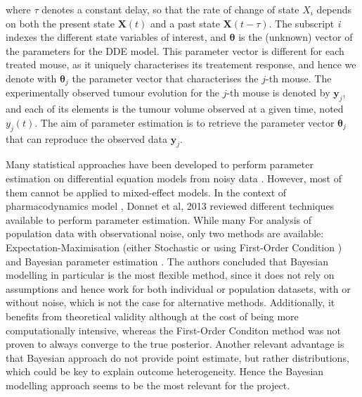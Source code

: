 \documentclass[11pt]{article}
\begin{document}
where $\tau$ denotes a constant delay, so that the rate of change of state $X_i$ depends on both the present state $\boldsymbol{X}(t)$ and a past state $\boldsymbol{X}(t-\tau)$. The subscript \textit{i} indexes the different state variables of interest, and $\boldsymbol{\theta}$ is the (unknown) vector of the parameters for the DDE model. This parameter vector is different for each treated mouse, as it uniquely characterises its treatement response, and hence we denote with $\boldsymbol{\theta}_j$ the parameter vector that characterises the $j$-th mouse. The experimentally observed tumour evolution for the $j$-th mouse is denoted by $\boldsymbol{y}_j$, and each of its elements is the tumour volume observed at a given time, noted $y_{j}(t)$. The aim of parameter estimation is to retrieve the parameter vector $\boldsymbol{\theta}_j$ that can reproduce the observed data $\boldsymbol{y}_j$. 



Many statistical approaches have been developed to perform parameter estimation on differential equation models from noisy data \cite{liu_wang}. However, most of them cannot be applied to mixed-effect models. In the context of pharmacodynamics model , Donnet et al, 2013 \cite{revParamEst} reviewed different techniques available to perform parameter estimation. While many For analysis of population data with observational noise, only two methods are available: Expectation-Maximisation (either Stochastic \cite{SAEM} or using First-Order Condition \cite{foce}) and Bayesian parameter estimation \cite{rosenbaum}. The authors concluded that Bayesian modelling in particular is the most flexible method, since it does not rely on assumptions and hence work for both individual or population datasets, with or without noise, which is not the case for alternative methods. Additionally, it benefits from theoretical validity although at the cost of being more computationally intensive, whereas the First-Order Conditon method was not proven to always converge to the true posterior. Another relevant advantage is that Bayesian approach do not provide point estimate, but rather distributions, which could be key to explain outcome heterogeneity. Hence the Bayesian modelling approach seems to be the most relevant for the project. 
\end{document}
